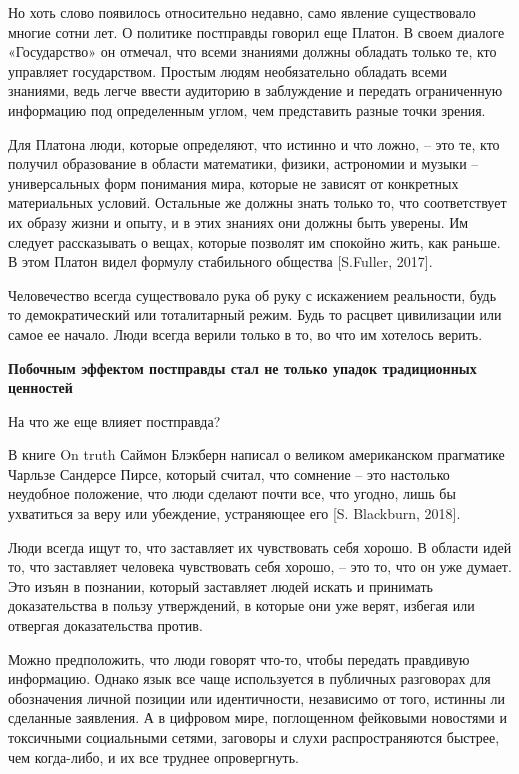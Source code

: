 Но хоть слово появилось относительно недавно, само явление существовало многие сотни лет. О политике постправды говорил еще Платон. В своем диалоге «Государство» он отмечал, что всеми знаниями должны обладать только те, кто управляет государством. Простым людям необязательно обладать всеми знаниями, ведь легче ввести аудиторию в заблуждение и передать ограниченную информацию под определенным углом, чем представить разные точки зрения.

Для Платона люди, которые определяют, что истинно и что ложно, – это те, кто получил образование в области математики, физики, астрономии и музыки – универсальных форм понимания мира, которые не зависят от конкретных материальных условий. Остальные же должны знать только то, что соответствует их образу жизни и опыту, и в этих знаниях они должны быть уверены. Им следует рассказывать о вещах, которые позволят им спокойно жить, как раньше. В этом Платон видел формулу стабильного общества [S.Fuller, 2017].

Человечество всегда существовало рука об руку с искажением реальности, будь то демократический или тоталитарный режим. Будь то расцвет цивилизации или самое ее начало. Люди всегда верили только в то, во что им хотелось верить.

\textbf{Побочным эффектом постправды стал не только упадок традиционных ценностей}

На что же еще влияет постправда?

В книге On truth Саймон Блэкберн написал о великом американском прагматике Чарльзе Сандерсе Пирсе, который считал, что сомнение – это настолько неудобное положение, что люди сделают почти все, что угодно, лишь бы ухватиться за веру или убеждение, устраняющее его [S. Blackburn, 2018].

Люди всегда ищут то, что заставляет их чувствовать себя хорошо. В области идей то, что заставляет человека чувствовать себя хорошо, – это то, что он уже думает. Это изъян в познании, который заставляет людей искать и принимать доказательства в пользу утверждений, в которые они уже верят, избегая или отвергая доказательства против.

Можно предположить, что люди говорят что-то, чтобы передать правдивую информацию. Однако язык все чаще используется в публичных разговорах для обозначения личной позиции или идентичности, независимо от того, истинны ли сделанные заявления. А в цифровом мире, поглощенном фейковыми новостями и токсичными социальными сетями, заговоры и слухи распространяются быстрее, чем когда-либо, и их все труднее опровергнуть.

